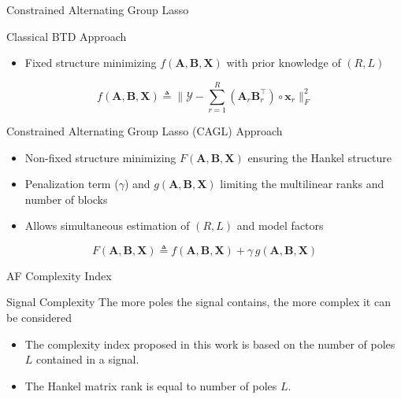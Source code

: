 \documentclass{beamer}
\begin{document}
	\begin{frame}{Constrained Alternating Group Lasso}
		
		\begin{block}{Classical BTD Approach}
			\begin{itemize}
				\item Fixed structure minimizing $f(\textbf{A}, \textbf{B}, \textbf{X})$ with prior knowledge of $(R,L)$
			\end{itemize}
		\end{block}
		\begin{equation}
			f(\textbf{A}, \textbf{B}, \textbf{X}) \triangleq
			 \Big\| {\mathcal{Y}} - \textstyle \sum_{r = 1}^{R} \left( \textbf{A}_r \textbf{B}_r^{\top} \right) \circ \textbf{x}_r  \Big\|_F^2
		\end{equation}
		\begin{block}{Constrained Alternating Group Lasso (CAGL) Approach}
			\begin{itemize}
				\item Non-fixed structure minimizing $F(\textbf{A},\textbf{B},\textbf{X})$ ensuring the Hankel structure
				\item Penalization term ($\gamma$) and $g({\textbf{A}, \textbf{B}, \textbf{X}})$ limiting the multilinear ranks and number of blocks
				\item Allows simultaneous estimation of $(R,L)$ and model factors
			\end{itemize}
		\end{block}
		\begin{equation}
				  F({\textbf{A}, \textbf{B}, \textbf{X}})
				 \triangleq  
				 f({\textbf{A}, \textbf{B}, \textbf{X}}) + \gamma \, g({\textbf{A}, \textbf{B}, \textbf{X}})
		\end{equation}
	\end{frame}
	
	\begin{frame}{AF Complexity Index}
		
		\begin{block}{Signal Complexity}
			The more poles the signal contains, the more complex it can be considered
		\end{block}
		
		\begin{itemize}
			\item The complexity index proposed in this work is based on the number of poles $L$ contained in a signal. 
			\item The Hankel matrix rank is equal to number of poles $L$.
		\end{itemize}

	\end{frame}
\end{document}
